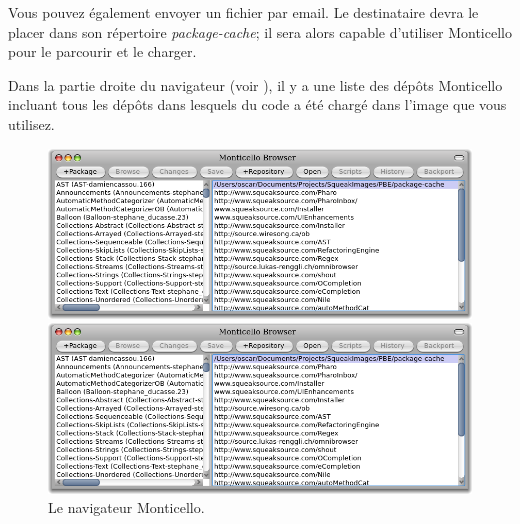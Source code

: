 \documentclass[a4paper,10pt,twoside]{book}
\begin{document}

Vous pouvez également envoyer un fichier  par email.
Le destinataire devra le placer dans son répertoire \emph{package-cache}; il sera alors capable d'utiliser Monticello pour le parcourir et le charger. 

Dans la partie droite du navigateur (voir ), il y a une liste des dépôts Monticello incluant tous les dépôts dans lesquels du code a été chargé dans l'image que vous utilisez. 

\begin{figure}[hbt]
\ifluluelse
	{\centerline {\includegraphics[width=\textwidth]{MonticelloBrowser}}}
	{\centerline {\includegraphics[scale=0.7]{MonticelloBrowser}}}
\caption{Le navigateur Monticello.
}
\end{figure}
\end{document}
